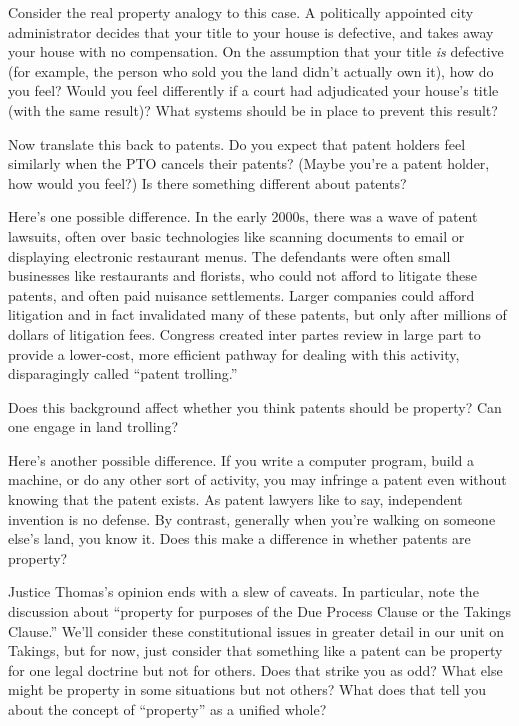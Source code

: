 \item Consider the real property analogy to this case. A politically appointed
city administrator decides that your title to your house is defective, and takes
away your house with no compensation. On the assumption that your title
\emph{is} defective (for example, the person who sold you the land didn't
actually own it), how do you feel? Would you feel differently if a court had
adjudicated your house's title (with the same result)? What systems should be in
place to prevent this result?

Now translate this back to patents. Do you expect that patent holders feel
similarly when the PTO cancels their patents? (Maybe you're a patent holder, how
would you feel?) Is there something different about patents?

\item Here's one possible difference. In the early 2000s, there was a wave of
patent lawsuits, often over basic technologies like scanning documents to email
or displaying electronic restaurant menus. The defendants were often small
businesses like restaurants and florists, who could not afford to litigate these
patents, and often paid nuisance settlements. Larger companies could afford
litigation and in fact invalidated many of these patents, but only after
millions of dollars of litigation fees. Congress created inter partes review in
large part to provide a lower-cost, more efficient pathway for dealing with
this activity, disparagingly called ``patent trolling.''

Does this background affect whether you think patents should be property? Can
one engage in land trolling?

\item Here's another possible difference. If you write a computer program, build
a machine, or do any other sort of activity, you may infringe a patent even
without knowing that the patent exists. As patent lawyers like to say,
independent invention is no defense. By contrast, generally when you're walking
on someone else's land, you know it. Does this make a difference in whether
patents are property?


\item Justice Thomas's opinion ends with a slew of caveats. In particular, note
the discussion about ``property for purposes of the Due Process Clause or the
Takings Clause.'' We'll consider these constitutional issues in greater detail
in our unit on Takings, but for now, just consider that something like a patent
can be property for one legal doctrine but not for others. Does that strike you
as odd? What else might be property in some situations but not others? What does
that tell you about the concept of ``property'' as a unified whole?

